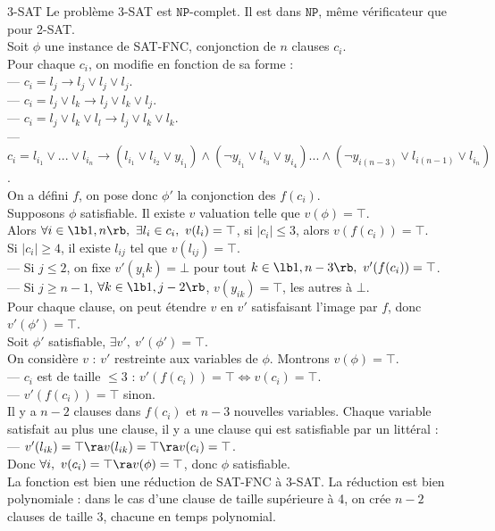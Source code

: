 \documentclass[french, 11pt]{article}
\newcommand*{\NP}{\texttt{NP}}
\begin{document}
\vspace*{-0.5cm}

\begin{ex}{3-SAT}{}
    Le problème 3-SAT est $\NP$-complet.
    \tcblower
    Il est dans $\NP$, même vérificateur que pour 2-SAT.\\
    Soit $\phi$ une instance de SAT-FNC, conjonction de $n$ clauses $c_i$.\\
    Pour chaque $c_i$, on modifie en fonction de sa forme :\\
    --- $c_i = l_j \rightarrow l_j \lor l_j \lor l_j$.\\
    --- $c_i = l_j \lor l_k \rightarrow l_j \lor l_k \lor l_j$.\\
    --- $c_i = l_j \lor l_k \lor l_l \rightarrow l_j \lor l_k \lor l_k$.\\
    --- $c_i = l_{i_1} \lor ... \lor l_{i_n} \rightarrow (l_{i_1}\lor l_{i_2} \lor y_{i_1}) \land (\lnot y_{i_1} \lor l_{i_3} \lor y_{i_4}) ... \land (\lnot y_{i(n-3)} \lor l_{i(n-1)} \lor l_{i_n})$.\\
    On a défini $f$, on pose donc $\phi'$ la conjonction des $f(c_i)$.\\
    \boxed{\ra} Supposons $\phi$ satisfiable. Il existe $v$ valuation telle que $v(\phi)=\top$.\\
    Alors $\forall i \in \lb1,n\rb, ~ \exists l_i \in c_i, ~ v(l_i)=\top$, si $|c_i|\leq3$, alors $v(f(c_i))=\top$.\\
    Si $|c_i|\geq4$, il existe $l_{ij}$ tel que $v(l_{ij})=\top$.\\
    --- Si $j\leq2$, on fixe $v'(y_ik)=\bot$ pour tout $k\in\lb1,n-3\rb, ~ v'(f(c_i))=\top$.\\
    --- Si $j\geq n-1$, $\forall k \in \lb1,j-2\rb$, $v(y_{ik})=\top$, les autres à $\bot$.\\
    Pour chaque clause, on peut étendre $v$ en $v'$ satisfaisant l'image par $f$, donc $v'(\phi')=\top$.\\
    \boxed{\la} Soit $\phi'$ satisfiable, $\exists v', ~ v'(\phi')=\top$.\\
    On considère $v$ : $v'$ restreinte aux variables de $\phi$. Montrons $v(\phi)=\top$.\\
    --- $c_i$ est de taille $\leq 3$ : $v'(f(c_i))=\top \iff v(c_i) = \top$.\\
    --- $v'(f(c_i))=\top$ sinon.\\
    Il y a $n-2$ clauses dans $f(c_i)$ et $n-3$ nouvelles variables. Chaque variable satisfait au plus une clause, il y a une clause qui est satisfiable par un littéral :\\
    --- $v'(l_{ik})=\top \ra v(l_{ik})= \top \ra v(c_i) = \top$.\\
    Donc $\forall i, ~ v(c_i) = \top \ra v(\phi)=\top$, donc $\phi$ satisfiable.\\
    La fonction est bien une réduction de SAT-FNC à 3-SAT.\n
    La réduction est bien polynomiale : dans le cas d'une clause de taille supérieure à 4, on crée $n-2$ clauses de taille 3, chacune en temps polynomial.
\end{ex}
\end{document}
